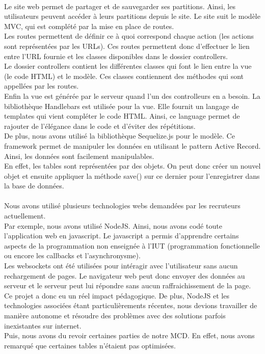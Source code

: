\paragraph{}
Le site web permet de partager et de sauvegarder ses partitions.
Ainsi, les utilisateurs peuvent accéder à leurs partitions depuis le site.
Le site suit le modèle MVC, qui est complété par la mise en place de routes. \\
Les routes permettent de définir ce à quoi correspond chaque action (les actions sont représentées par les URLs). Ces routes permettent donc d'effectuer le lien entre l'URL fournie et les classes disponibles dans le dossier controllers. \\
Le dossier controllers contient les différentes classes qui font le lien entre la vue (le code HTML) et le modèle. Ces classes contiennent des méthodes qui sont appellées par les routes. \\
Enfin la vue est générée par le serveur quand l'un des controlleurs en a besoin. La bibliothèque Handlebars est utilisée pour la vue. Elle fournit un langage de templates qui vient compléter le code HTML. Ainsi, ce language permet de rajouter de l'élégance dans le code et d'éviter des répétitions. \\
De plus, nous avons utilisé la bibliothèque Sequelize.js pour le modèle.
Ce framework permet de manipuler les données en utilisant le pattern Active Record. Ainsi, les données sont facilement manipulables. \\
En effet, les tables sont représentées par des objets. On peut donc créer un nouvel objet et ensuite appliquer la méthode save() sur ce dernier pour l'enregistrer dans la base de données. \\
\paragraph{}
Nous avons utilisé plusieurs technologies webs demandées par les recruteurs actuellement. \\
Par exemple, nous avons utilisé NodeJS. Ainsi, nous avons codé toute l'application web en javascript. Le javascript a permis d'apprendre certains aspects de la programmation non enseignée à l'IUT (programmation fonctionnelle ou encore les callbacks et l'asynchronysme). \\
Les websockets ont été utilisées pour intéragir avec l'utilisateur sans aucun rechargement de pages. Le navigateur web peut donc envoyer des données au serveur et le serveur peut lui répondre sans aucun raffraichissement de la page. \\
Ce projet a donc eu un réel impact pédagogique. De plus, NodeJS et les technologies associées étant particulièrements récentes, nous devions travailler de manière autonome et résoudre des problèmes avec des solutions parfois inexistantes sur internet. \\
Puis, nous avons du revoir certaines parties de notre MCD. 
En effet, nous avons remarqué que certaines tables n'étaient pas optimisées. 

